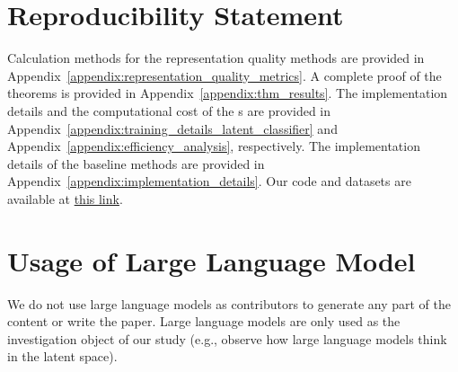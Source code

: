 \documentclass{article} %
\begin{document}
\section{Reproducibility Statement}\label{appendix:reproducibility_statement}
Calculation methods for the representation quality methods are provided in Appendix~\ref{appendix:representation_quality_metrics}. A complete proof of the theorems is provided in Appendix~\ref{appendix:thm_results}. The implementation details and the computational cost of the {\LRM}s are provided in Appendix~\ref{appendix:training_details_latent_classifier} and Appendix~\ref{appendix:efficiency_analysis}, respectively. The implementation details of the baseline methods are provided in Appendix~\ref{appendix:implementation_details}. Our code and datasets are available at \href{https://github.com/ninglab/LTO}{this link}.
\section{Usage of Large Language Model}
We do not use large language models as contributors to generate any part of the content or write the paper. Large language models are only used as the investigation object of our study (e.g., observe how large language models think in the latent space).
\end{document}
